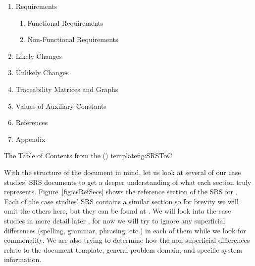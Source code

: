 {\begin{center}
\begin{enumerate}[nosep, label*=\arabic*.]
\begin{enumerate}[nosep, label*=\arabic*.]
\begin{enumerate}[nosep, label*=\arabic*.]
    \item Data Definitions
    \item Instance Models
    \item Data Constraints
    \item Properties of a Correct Solution
\end{enumerate}
\end{enumerate}
\item Requirements
\begin{enumerate}[nosep, label*=\arabic*.]
  \item Functional Requirements
  \item Non-Functional Requirements         
\end{enumerate}
\item Likely Changes
\item Unlikely Changes
\item Traceability Matrices and Graphs
\item Values of Auxiliary Constants
\item References
\item Appendix
\end{enumerate}
  \end{center}
}{The Table of Contents from the () \smithea{} 
template}{fig:SRSToC}

With the structure of the document in mind, let us look at several of our case
studies' SRS documents to get a deeper understanding of what each section truly
represents. Figure~\ref{fig:csRefSecs} shows the reference section of the SRS 
for \gb. Each of the case studies' SRS contains a similar section so for 
brevity we will omit the others here, but they can be found at . 
We will look into the case studies in more detail later , for now we will try to 
ignore any superficial differences (spelling, grammar, phrasing, etc.) in each 
of them while we look for commonality. We are also trying to determine how the 
non-superficial differences relate to the document template, general problem 
domain, and specific system information.

